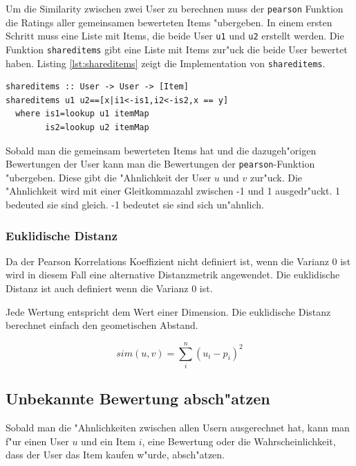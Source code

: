 \documentclass[a4paper, 11pt]{article}
\begin{document}
Um die Similarity zwischen zwei User zu berechnen muss der \verb|pearson| Funktion die Ratings aller gemeinsamen bewerteten Items "ubergeben. In einem ersten Schritt muss eine Liste mit Items, die beide User \verb|u1| und \verb|u2| erstellt werden. Die Funktion \verb|shareditems| gibt eine Liste mit Items zur"uck die beide User bewertet haben. Listing \ref{lst:shareditems} zeigt die Implementation von \verb|shareditems|.

\begin{lstlisting}[caption=shareditems, label=lst:shareditems]
shareditems :: User -> User -> [Item]
shareditems u1 u2==[x|i1<-is1,i2<-is2,x == y]
  where is1=lookup u1 itemMap
        is2=lookup u2 itemMap
\end{lstlisting}

Sobald man die gemeinsam bewerteten Items hat und die dazugeh"origen Bewertungen der User kann man die Bewertungen der \verb|pearson|-Funktion "ubergeben. Diese gibt die "Ahnlichkeit der User $u$ und $v$ zur"uck. Die "Ahnlichkeit wird mit einer Gleitkommazahl zwischen -1 und 1 ausgedr"uckt. 1 bedeuted sie sind gleich. -1 bedeutet sie sind sich un"ahnlich.

\subsubsection{Euklidische Distanz}
\label{sec:euclid}

Da der Pearson Korrelations Koeffizient nicht definiert ist, wenn die Varianz 0 ist wird in diesem Fall eine alternative Distanzmetrik angewendet. Die euklidische Distanz ist auch definiert wenn die Varianz 0 ist.

Jede Wertung entspricht dem Wert einer Dimension. Die euklidische Distanz berechnet einfach den geometischen Abstand.

\begin{equation}
  \label{eq:euclid}
 sim(u,v) = \sum_i^n (u_i - p_i )^2
\end{equation}

\subsection{Unbekannte Bewertung absch"atzen}
\label{sec:compp}

Sobald man die "Ahnlichkeiten zwischen allen Usern ausgerechnet hat, kann man f"ur einen User $u$ und ein Item $i$, eine Bewertung oder die Wahrscheinlichkeit, dass der User das Item kaufen w"urde, absch"atzen.
\end{document}
